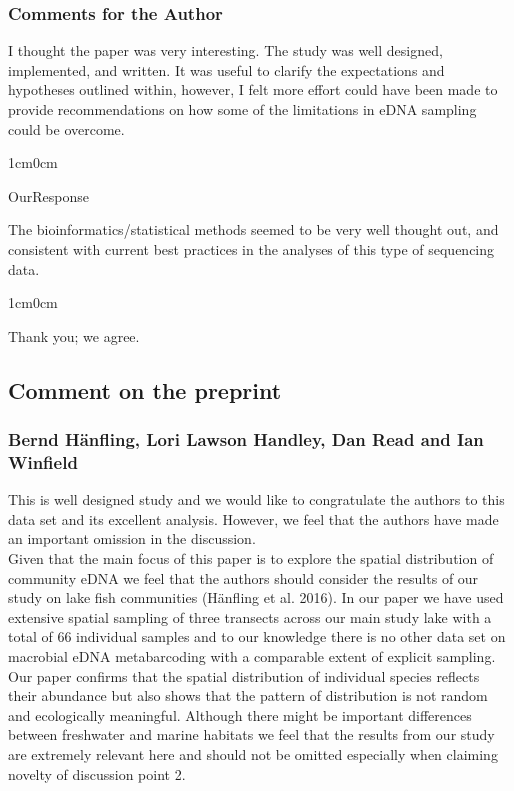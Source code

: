\documentclass{article}
\newenvironment{response}
	{
	\begin{adjustwidth}{1cm}{0cm}
	\color{peerjBlue}
	}
	{
	\end{adjustwidth}
	}
\begin{document}
\subsubsection*{Comments for the Author}
I thought the paper was very interesting. The study was well designed, implemented, and written. It was useful to clarify the expectations and hypotheses outlined within, however, I felt more effort could have been made to provide recommendations on how some of the limitations in eDNA sampling could be overcome.
\begin{response}
  OurResponse\\
\end{response}

The bioinformatics/statistical methods seemed to be very well thought out, and consistent with current best practices in the analyses of this type of sequencing data.
\begin{response}
	Thank you; we agree.\\
\end{response}


\subsection*{Comment on the preprint}

\subsubsection*{Bernd Hänfling, Lori Lawson Handley, Dan Read and Ian Winfield}

This is well designed study and we would like to congratulate the authors to this data set and its excellent analysis. However, we feel that the authors have made an important omission in the discussion.\\


Given that the main focus of this paper is to explore the spatial distribution of community eDNA we feel that the authors should consider the results of our study on lake fish communities (Hänfling et al. 2016). In our paper we have used extensive spatial sampling of three transects across our main study lake with a total of 66 individual samples and to our knowledge there is no other data set on macrobial eDNA metabarcoding with a comparable extent of explicit sampling. Our paper confirms that the spatial distribution of individual species reflects their abundance but also shows that the pattern of distribution is not random and ecologically meaningful. Although there might be important differences between freshwater and marine habitats we feel that the results from our study are extremely relevant here and should not be omitted especially when claiming novelty of discussion point 2.\\
\end{document}
